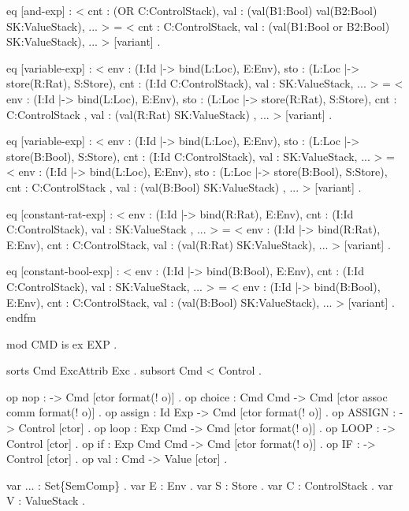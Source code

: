 \documentclass{llncs}%
\begin{document}
    eq [and-exp] :
        < cnt : (OR C:ControlStack),
          val : (val(B1:Bool) val(B2:Bool) SK:ValueStack), ... > 
     =
        < cnt : C:ControlStack,
          val : (val(B1:Bool or B2:Bool) SK:ValueStack), ... > [variant] .

    eq [variable-exp] :
        < env : (I:Id |-> bind(L:Loc), E:Env),
          sto : (L:Loc |-> store(R:Rat), S:Store),
          cnt : (I:Id C:ControlStack), val : SK:ValueStack, ... > 
     =
        < env : (I:Id |-> bind(L:Loc), E:Env),
          sto : (L:Loc |-> store(R:Rat), S:Store),
          cnt : C:ControlStack ,
          val : (val(R:Rat) SK:ValueStack) , ... > [variant] .

    eq [variable-exp] :
        < env : (I:Id |-> bind(L:Loc), E:Env),
          sto : (L:Loc |-> store(B:Bool), S:Store),
          cnt : (I:Id C:ControlStack), val : SK:ValueStack, ... > 
     =
        < env : (I:Id |-> bind(L:Loc), E:Env),
          sto : (L:Loc |-> store(B:Bool), S:Store),
          cnt : C:ControlStack ,
          val : (val(B:Bool) SK:ValueStack) , ... > [variant] .

    eq [constant-rat-exp] :
        < env : (I:Id |-> bind(R:Rat), E:Env), cnt : (I:Id C:ControlStack),
          val : SK:ValueStack , ... > 
     =
        < env : (I:Id |-> bind(R:Rat), E:Env), cnt : C:ControlStack,
          val : (val(R:Rat) SK:ValueStack), ... > [variant] .

    eq [constant-bool-exp] :
        < env : (I:Id |-> bind(B:Bool), E:Env), cnt : (I:Id C:ControlStack),
          val : SK:ValueStack, ... > 
     =
        < env : (I:Id |-> bind(B:Bool), E:Env), cnt : C:ControlStack,
          val : (val(B:Bool) SK:ValueStack), ... > [variant] .
endfm
\nwendcode{}\nwdocspar

\nwenddocs{}\endmoddef\nwstartdeflinemarkup\nwenddeflinemarkup
mod CMD is
    ex EXP .

    sorts Cmd ExcAttrib Exc .
    subsort Cmd < Control .

    op nop : -> Cmd [ctor format(! o)] .
    op choice : Cmd Cmd -> Cmd [ctor assoc comm format(! o)] .
    op assign : Id Exp -> Cmd [ctor format(! o)] .
    op ASSIGN : -> Control [ctor] .
    op loop : Exp Cmd -> Cmd [ctor format(! o)] .
    op LOOP : -> Control [ctor] .
    op if : Exp Cmd Cmd -> Cmd [ctor format(! o)] .
    op IF : -> Control [ctor] .
    op val : Cmd -> Value [ctor] .

    var ... : Set\{SemComp\} . var E : Env . var S : Store .
    var C : ControlStack . var V : ValueStack .
\end{document}
